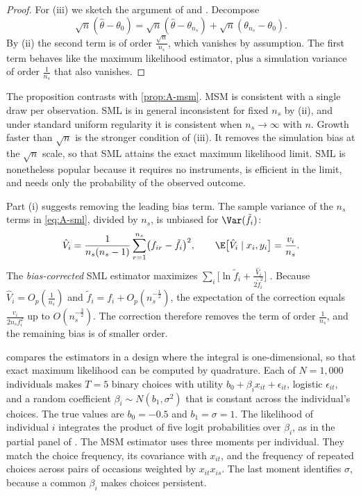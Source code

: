 \begin{proof}
For (iii) we sketch the argument of \citet{Lee1992} and \citet{GourierouxMonfort1996}. Decompose
\begin{equation*}
  \sqrt n(\hat\theta - \theta_0) = \sqrt n(\hat\theta - \theta_{n_s}) + \sqrt n(\theta_{n_s} - \theta_0).
\end{equation*}
By (ii) the second term is of order $\frac{\sqrt n}{n_s}$, which vanishes by assumption. The first term behaves like
the maximum likelihood estimator, plus a simulation variance of order $\frac{1}{n_s}$ that also vanishes.
\end{proof}

The proposition contrasts with \cref{prop:A-msm}. MSM is consistent with a single draw per observation. SML is in
general inconsistent for fixed $n_s$ by (ii), and under standard uniform regularity it is consistent when $n_s \to
\infty$ with $n$. Growth faster than $\sqrt n$ is the stronger condition of (iii). It removes the simulation bias at the $\sqrt n$
scale, so that SML attains the exact maximum likelihood limit. SML is nonetheless popular because it requires no
instruments, is efficient in the limit, and needs only the probability of the observed outcome.

Part (i) suggests removing the leading bias term. The sample variance of the $n_s$ terms in \eqref{eq:A-sml},
divided by $n_s$, is unbiased for $\Var(\tilde f_i)$:
\begin{equation*}
  \hat V_i = \frac{1}{n_s(n_s - 1)}\sum_{r=1}^{n_s}\bigl(f_{ir} - \tilde f_i\bigr)^2, \qquad
  \E\bigl[\hat V_i \mid x_i, y_i\bigr] = \frac{v_i}{n_s}.
\end{equation*}
The \emph{bias-corrected} SML estimator maximizes $\sum_i\bigl[\ln\tilde f_i + \frac{\hat V_i}{2\tilde f_i^2}\bigr]$
\citep[p.~45]{GourierouxMonfort1996}. Because $\hat V_i = O_p(\frac{1}{n_s})$ and $\tilde f_i = f_i +
O_p(n_s^{-\frac{1}{2}})$, the expectation of the correction equals $\frac{v_i}{2n_sf_i^2}$ up to
$O(n_s^{-\frac{3}{2}})$. The correction therefore removes the term of order $\frac{1}{n_s}$, and the remaining bias
is of smaller order.

 compares the estimators in a design where the integral is one-dimensional, so that exact
maximum likelihood can be computed by quadrature. Each of $N = 1{,}000$ individuals makes $T = 5$ binary choices with
utility $b_0 + \beta_ix_{it} + \epsilon_{it}$, logistic $\epsilon_{it}$, and a random coefficient $\beta_i \sim
N(b_1, \sigma^2)$ that is constant across the individual's choices. The true values are $b_0 = -0.5$ and $b_1 =
\sigma = 1$. The likelihood of individual $i$ integrates the product of five logit probabilities over $\beta_i$, as in
the partial panel of \citet{Gentzkow2007}. The MSM estimator uses three moments per individual. They match the
choice frequency, its covariance with $x_{it}$, and the frequency of repeated choices across pairs of occasions
weighted by $x_{it}x_{is}$. The last moment identifies $\sigma$, because a common $\beta_i$ makes choices persistent.

